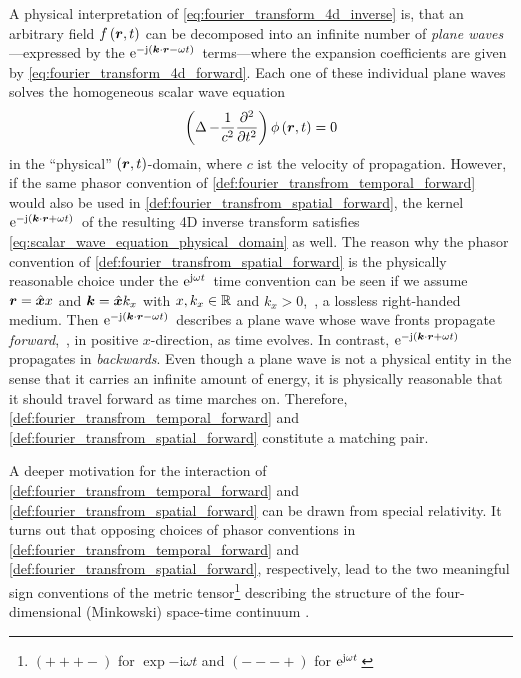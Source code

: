 A physical interpretation of \eqref{eq:fourier_transform_4d_inverse} is,
that an arbitrary field $f \left( \robs, t \right)$ can be decomposed 
into an infinite number of \emph{plane waves}---expressed by the
$\exp{-\im \left( \pvec{k} \cdot \robs - \omega t \right)}$ terms---where
the expansion coefficients are given by \eqref{eq:fourier_transform_4d_forward}.
Each one of these individual plane waves solves
the homogeneous scalar wave equation \cite[32]{Sommerfeld1964}
\begin{equation}\label{eq:scalar_wave_equation_physical_domain}
	\left( \laplace - \frac{1}{c^2} \frac{\partial^2}{\partial t^2} \right)	
	\phi \left( \pvec{r}, t \right) = 0
\end{equation}
in the \enquote{physical} $\left(\pvec{r}, t\right)$-domain, where $c$ ist
the velocity of propagation.
However, if the same phasor convention of
\cref{def:fourier_transfrom_temporal_forward} would also be used in
\cref{def:fourier_transfrom_spatial_forward}, the kernel
$\exp{-\im \left( \pvec{k} \cdot \robs + \omega t \right)}$
of the resulting 4D inverse transform satisfies
\eqref{eq:scalar_wave_equation_physical_domain} as well.
The reason why the phasor convention of
\cref{def:fourier_transfrom_spatial_forward} is the physically reasonable choice
under the $\mathrm{e}^{\mathrm{j} \omega t}\,$ time convention
can be seen if we assume $\pvec{r} = \uv{x} x$ and $\pvec{k} = \uv{x} k_x$
with $x, k_x \in \mathbb{R}$ and $k_x > 0$,~\ie, a lossless right-handed medium.
Then $\exp{-\im \left( \pvec{k} \cdot \robs - \omega t \right)}$ describes
a plane wave whose wave fronts propagate \emph{forward},~\ie, in positive
$x$-direction, as time evolves.
In contrast,
$\exp{-\im \left( \pvec{k} \cdot \robs + \omega t \right)}$
propagates in \emph{backwards}.
Even though a plane wave is not a physical entity in the sense that it carries
an infinite amount of energy, it is physically reasonable that it should
travel forward as time marches on.
Therefore, \cref{def:fourier_transfrom_temporal_forward} and
\cref{def:fourier_transfrom_spatial_forward} constitute a matching pair.

A deeper motivation for the interaction of
\cref{def:fourier_transfrom_temporal_forward} and 
\cref{def:fourier_transfrom_spatial_forward} can be drawn from special
relativity.
It turns out that opposing choices of phasor conventions in
\cref{def:fourier_transfrom_temporal_forward} and
\cref{def:fourier_transfrom_spatial_forward}, respectively, lead to the two
meaningful sign conventions of the metric tensor\footnote{
	$\left( + + + - \right)$ for $\exp{-\mathrm{i} \omega t}$
	and $\left( - - - + \right)$ for $\mathrm{e}^{\mathrm{j} \omega t}\,$}
describing the structure of the four-dimensional (Minkowski) space-time
continuum \cite[p624]{Jackson2013}\cite{Kaiser2016}.









